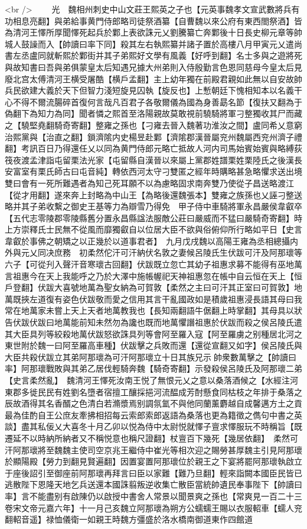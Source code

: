 <br />
　　光　魏相州刺史中山文莊王熙英之子也【元英事魏孝文宣武數將兵有功相息亮翻】與弟給事黄門侍郎略司徒祭酒纂【自曹魏以來公府有東西閤祭酒】皆為清河王懌所厚聞懌死起兵於鄴上表欲誅元乂劉騰纂亡奔鄴後十日長史柳元章等帥城人鼓譟而入【帥讀曰率下同】殺其左右執熙纂并諸子置於高樓八月甲寅元乂遣尚書左丞盧同就斬熙於鄴街并其子弟熙好文學有風義【好呼到翻】名士多與之遊將死與故知書曰吾與弟俱蒙皇太后知遇兄據大州弟則入侍殷勤言色恩同慈母今皇太后見廢北宫太傅清河王横受屠酷【横戶孟翻】主上幼年獨在前殿君親如此無以自安故帥兵民欲建大義於天下但智力淺短旋見囚執【旋反也】上慙朝廷下愧相知本以名義干心不得不爾流腸碎首復何言哉凡百君子各敬爾儀為國為身善勗名節【復扶又翻為于偽翻下為知力為同】聞者憐之熙首至洛陽親故莫敢視前驍騎將軍刁整獨收其尸而藏之【驍堅堯翻騎奇寄翻】整雍之孫也【刁雍去晉入魏著功淮汝之間】盧同希乂意窮治熙黨與【治直之翻】鎖濟隂内史楊昱赴鄴【濟隂郡漢晉屬兖州魏屬西兖州濟子禮翻】考訊百日乃得還任乂以同為黄門侍郎元略亡抵故人河内司馬始賓始賓與略縛荻筏夜渡孟津詣屯留栗法光家【屯留縣自漢晉以來屬上黨郡姓譜栗姓栗陸氏之後漢長安富室有栗氏師古曰屯音純】轉依西河太守刁雙匿之經年時購略甚急略懼求送出境雙曰會有一死所難遇者為知己死耳願不以為慮略固求南奔雙乃使從子昌送略渡江【從才用翻】遂來奔上封略為中山王【為略後還魏張本】雙雍之族孫也乂誣刁整送略并其子弟收繫之御史王基等力為辯雪乃得免　甲子侍中車騎將軍永昌嚴侯韋叡卒【五代志零陵郡零陵縣舊分置永昌縣諡法服敵公莊曰嚴威而不猛曰嚴騎奇寄翻】時上方崇釋氏士民無不從風而靡獨叡自以位居大臣不欲與俗俯仰所行略如平日【史言韋叡於事佛之朝矯之以正幾於以道事君者】　九月戊戌魏以高陽王雍為丞相總攝内外與元乂同决庶務　初柔然佗汗可汗納伏名敦之妻候呂陵氏生伏跋可汗及阿那瓌等六子【可從刋入聲汗音寒瓌古回翻】伏跋既立忽亡其幼子祖惠求募不能得有巫地萬言祖惠今在天上我能呼之乃於大澤中施帳幄祀天神祖惠忽在帳中自云恒在天上【恒戶登翻】伏跋大喜號地萬為聖女納為可賀敦【柔然之主曰可汗其正室曰可賀敦】地萬既挾左道復有姿色伏跋敬而愛之信用其言干亂國政如是積歲祖惠浸長語其母曰我常在地萬家未嘗上天上天者地萬教我也【長知兩翻語牛倨翻上時掌翻】其母具以狀告伏跋伏跋曰地萬能前知未然勿為讒也既而地萬懼譖祖惠於伏跋而殺之侯呂陵氏遣其大臣具列等絞殺地萬伏跋怒欲誅具列等會阿至羅入寇【阿至羅虜之别種居北河之東世附於魏一曰阿至羅高車種】伏跋擊之兵敗而還【還從宣翻又如字】侯呂陵氏與大臣共殺伏跋立其弟阿那瓌為可汗阿那瓌立十日其族兄示帥衆數萬擊之【帥讀曰率】阿那瓌戰敗與其弟乙居伐輕騎奔魏【騎奇寄翻】示發殺侯呂陵氏及阿那瓌二弟【史言柔然亂】　魏清河王懌死汝南王悦了無恨元乂之意以桑落酒候之【水經注河東郡多徙民民有姓劉名墮者宿擅工釀採挹河流醖成芳酎懸食同枯枝之年排于桑落之辰故酒得其名香醑之色清白若滫漿焉别調氛氳不與他同蘭薰麝越自成馨邁方土之貢最為佳酌自王公庶友牽拂相招每云索郎索郎返語為桑落也更為籍徵之儁句中書之英談】盡其私佞乂大喜冬十月乙卯以悦為侍中太尉悦就懌子亶求懌服玩不時稱旨【既遷延不以時納所納者又不稱悦意也稱尺證翻】杖亶百下幾死【幾居依翻】　柔然可汗阿那瓌將至魏魏主使司空京兆王繼侍中崔光等相次迎之賜勞甚厚魏主引見阿那瓌於顯陽殿【勞力到翻見賢遍翻】因置宴置阿那瓌位於親王之下宴將罷阿那瓌執啟立于座後詔引至御座前阿那瓌再拜言曰臣以家難【難乃旦翻】輕來詣闕本國臣民皆已逃散陛下恩隆天地乞兵送還本國誅翦叛逆收集亡散臣當統帥遺民奉事陛下【帥讀曰率】言不能盡别有啟陳仍以啟授中書舍人常景以聞景爽之孫也【常爽見一百二十三卷宋文帝元嘉六年】十一月己亥魏立阿那瓌為朔方公蠕蠕王賜以衣服軺車【蠕人兖翻軺音遥】禄恤儀衛一如親王時魏方彊盛於洛水橋南御道東作四館道